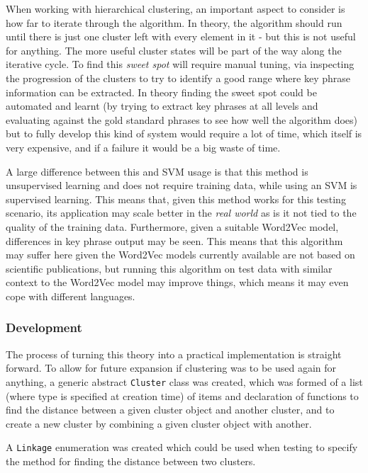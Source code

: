 When working with hierarchical clustering, an important aspect to consider is how far to iterate through the algorithm. In theory, the algorithm should run until there is just one cluster left with every element in it - but this is not useful for anything. The more useful cluster states will be part of the way along the iterative cycle. To find this \textit{sweet spot} will require manual tuning, via inspecting the progression of the clusters to try to identify a good range where key phrase information can be extracted. In theory finding the sweet spot could be automated and learnt (by trying to extract key phrases at all levels and evaluating against the gold standard phrases to see how well the algorithm does) but to fully develop this kind of system would require a lot of time, which itself is very expensive, and if a failure it would be a big waste of time.

A large difference between this and SVM usage is that this method is unsupervised learning and does not require training data, while using an SVM is supervised learning. This means that, given this method works for this testing scenario, its application may scale better in the \textit{real world} as is it not tied to the quality of the training data. Furthermore, given a suitable Word2Vec model, differences in key phrase output may be seen. This means that this algorithm may suffer here given the Word2Vec models currently available are not based on scientific publications, but running this algorithm on test data with similar context to the Word2Vec model may improve things, which means it may even cope with different languages.

\subsubsection*{Development}
The process of turning this theory into a practical implementation is straight forward. To allow for future expansion if clustering was to be used again for anything, a generic abstract \texttt{Cluster} class was created, which was formed of a list (where type is specified at creation time) of items and declaration of functions to find the distance between a given cluster object and another cluster, and to create a new cluster by combining a given cluster object with another.

A \texttt{Linkage} enumeration was created which could be used when testing to specify the method for finding the distance between two clusters.

